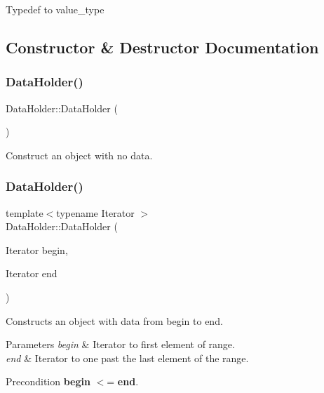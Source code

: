 Typedef to value\+\_\+type 

\subsection{Constructor \& Destructor Documentation}
\mbox{\label{classDataHolder_af76f72449ab22dafc1efa03084b525e5}} 
\subsubsection{\texorpdfstring{Data\+Holder()}{DataHolder()}\hspace{0.1cm}{\footnotesize\ttfamily [1/4]}}
{\footnotesize\ttfamily Data\+Holder\+::\+Data\+Holder (\begin{DoxyParamCaption}{ }\end{DoxyParamCaption})\hspace{0.3cm}{\ttfamily [default]}}

Construct an object with no data. \mbox{\label{classDataHolder_a407d59793678968e1e4803bceeac9df5}} 
\subsubsection{\texorpdfstring{Data\+Holder()}{DataHolder()}\hspace{0.1cm}{\footnotesize\ttfamily [2/4]}}
{\footnotesize\ttfamily template$<$typename Iterator $>$ \\
Data\+Holder\+::\+Data\+Holder (\begin{DoxyParamCaption}\item[{Iterator}]{begin,  }\item[{Iterator}]{end }\end{DoxyParamCaption})}

Constructs an object with data from begin to end. 
\begin{DoxyParams}{Parameters}
{\em begin} & Iterator to first element of range. \\
\hline
{\em end} & Iterator to one past the last element of the range. \\
\hline
\end{DoxyParams}
\begin{DoxyPrecond}{Precondition}
{\bfseries begin} $<$= {\bfseries end}. 
\end{DoxyPrecond}
\mbox{\label{classDataHolder_a62ed6b152862e8b9572187807640c586}} 
